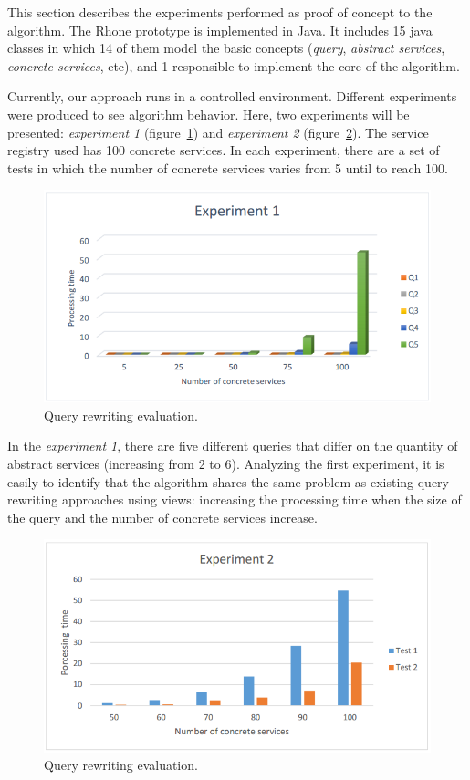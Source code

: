 This section describes the experiments performed as proof of concept to the algorithm.
The Rhone prototype is implemented in Java.
It includes 15 java classes in which 14 of them model the basic concepts 
(\textit{query}, \textit{abstract services}, \textit{concrete services}, etc), 
and 1 responsible to implement the core of the algorithm.

Currently, our approach runs in a controlled environment. 
Different experiments were produced to see algorithm behavior.
Here, two experiments will be presented: \textit{experiment 1} (figure~\ref{fig01}) and \textit{experiment 2} (figure~\ref{fig02}). 
The service registry used has 100 concrete services. 
In each experiment, there are a set of tests in which the number of concrete 
services varies from 5 until to reach 100.

\begin{figure}[!h]
\centering
\includegraphics[scale=0.4]{exp1.png}
\caption{Query rewriting evaluation.}\label{fig01}
\end{figure} 

In the \textit{experiment 1}, there are five different queries that differ on the quantity of abstract services (increasing from 2 to 6). Analyzing the first experiment, it is easily to identify that the algorithm shares the same problem as existing query rewriting approaches using views: increasing the processing time when the size of the query and the number of concrete services increase. 

\begin{figure}[!h]
\centering
\includegraphics[scale=0.4]{exp2.png}
\caption{Query rewriting evaluation.}\label{fig02}
\end{figure} 

